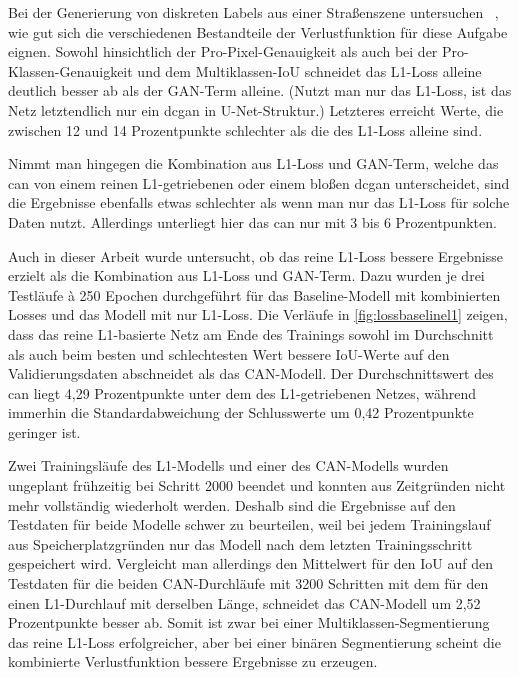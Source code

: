 Bei der Generierung von diskreten Labels aus einer Straßenszene untersuchen \citeauthor{Isola.2017}~\cite{Isola.2017}, wie gut sich die verschiedenen Bestandteile der Verlustfunktion für diese Aufgabe eignen.
Sowohl hinsichtlich der Pro-Pixel-Genauigkeit als auch bei der Pro-Klassen-Genauigkeit und dem Multiklassen-IoU schneidet das L1-Loss alleine deutlich besser ab als der GAN-Term alleine.
(Nutzt man nur das L1-Loss, ist das Netz letztendlich nur ein \gls{dcgan} in U-Net-Struktur.)
Letzteres erreicht Werte, die zwischen 12 und 14 Prozentpunkte schlechter als die des L1-Loss alleine sind.

Nimmt man hingegen die Kombination aus L1-Loss und GAN-Term, welche das \gls{can} von einem reinen L1-getriebenen oder einem bloßen \gls{dcgan} unterscheidet, sind die Ergebnisse ebenfalls etwas schlechter als wenn man nur das L1-Loss für solche Daten nutzt.
Allerdings unterliegt hier das \gls{can} nur mit 3 bis 6 Prozentpunkten.

Auch in dieser Arbeit wurde untersucht, ob das reine L1-Loss bessere Ergebnisse erzielt als die Kombination aus L1-Loss und GAN-Term.
Dazu wurden je drei Testläufe à 250 Epochen durchgeführt für das Baseline-Modell mit kombinierten Losses und das Modell mit nur L1-Loss.
Die Verläufe in \autoref{fig:lossbaselinel1} zeigen, dass das reine L1-basierte Netz am Ende des Trainings sowohl im Durchschnitt als auch beim besten und schlechtesten Wert bessere IoU-Werte auf den Validierungsdaten abschneidet als das CAN-Modell.
Der Durchschnittswert des \gls{can} liegt 4,29 Prozentpunkte unter dem des L1-getriebenen Netzes, während immerhin die Standardabweichung der Schlusswerte um 0,42 Prozentpunkte geringer ist.

Zwei Trainingsläufe des L1-Modells und einer des CAN-Modells wurden ungeplant frühzeitig bei Schritt 2000 beendet und konnten aus Zeitgründen nicht mehr vollständig wiederholt werden.
Deshalb sind die Ergebnisse auf den Testdaten für beide Modelle schwer zu beurteilen, weil bei jedem Trainingslauf aus Speicherplatzgründen nur das Modell nach dem letzten Trainingsschritt gespeichert wird.
Vergleicht man allerdings den Mittelwert für den IoU auf den Testdaten für die beiden CAN-Durchläufe mit 3200 Schritten mit dem für den einen L1-Durchlauf mit derselben Länge, schneidet das CAN-Modell um 2,52 Prozentpunkte besser ab.
Somit ist zwar bei einer Multiklassen-Segmentierung das reine L1-Loss erfolgreicher, aber bei einer binären Segmentierung scheint die kombinierte Verlustfunktion bessere Ergebnisse zu erzeugen.

